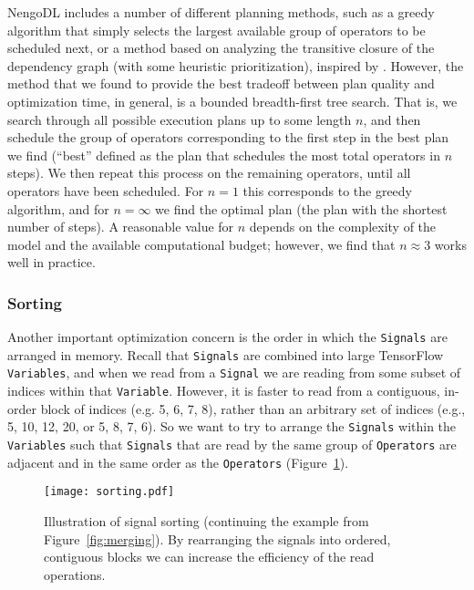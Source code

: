 \documentclass{article}
\begin{document}
NengoDL includes a number of different planning methods, such as a greedy algorithm that simply selects the largest available group of operators to be scheduled next, or a method based on analyzing the transitive closure of the dependency graph (with some heuristic prioritization), inspired by \citet{Gosmann2017}.  However, the method that we found to provide the best tradeoff between plan quality and optimization time, in general, is a bounded breadth-first tree search.  That is, we search through all possible execution plans up to some length $n$, and then schedule the group of operators corresponding to the first step in the best plan we find (``best'' defined as the plan that schedules the most total operators in $n$ steps).  We then repeat this process on the remaining operators, until all operators have been scheduled.  For $n=1$ this corresponds to the greedy algorithm, and for $n=\infty$ we find the optimal plan (the plan with the shortest number of steps).  A reasonable value for $n$ depends on the complexity of the model and the available computational budget; however, we find that $n \approx 3$ works well in practice.

\subsubsection{Sorting}

Another important optimization concern is the order in which the \texttt{Signals} are arranged in memory.  Recall that \texttt{Signals} are combined into large TensorFlow \texttt{Variables}, and when we read from a \texttt{Signal} we are reading from some subset of indices within that \texttt{Variable}.  However, it is faster to read from a contiguous, in-order block of indices (e.g. 5, 6, 7, 8), rather than an arbitrary set of indices (e.g., 5, 10, 12, 20, or 5, 8, 7, 6).  So we want to try to arrange the \texttt{Signals} within the \texttt{Variables} such that \texttt{Signals} that are read by the same group of \texttt{Operators} are adjacent and in the same order as the \texttt{Operators} (Figure~\ref{fig:sorting}).

\begin{figure}
\centering
\texttt{[image: sorting.pdf]}
\caption{Illustration of signal sorting (continuing the example from Figure~\ref{fig:merging}).  By rearranging the signals into ordered, contiguous blocks we can increase the efficiency of the read operations.}
\label{fig:sorting}
\end{figure}
\end{document}
